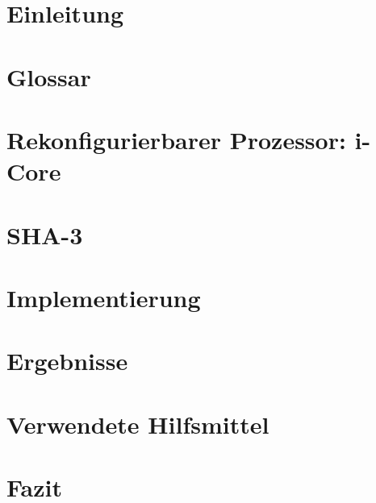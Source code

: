 \renewcommand{\chaptername}{Kapitel}

\chapter{Einleitung}


\chapter{Glossar}


\chapter{Rekonfigurierbarer Prozessor: i-Core}
\label{cha:icore}


\chapter{SHA-3}
\label{cha:sha3}


\chapter{Implementierung}


\newpage

\newpage


\chapter{Ergebnisse}
\label{cha:ergebnisse}


\chapter{Verwendete Hilfsmittel}


\chapter{Fazit}

